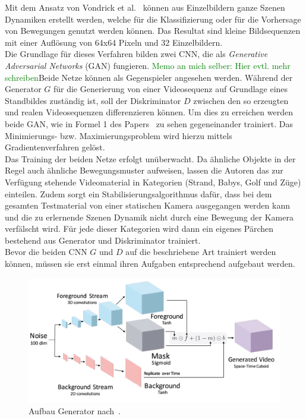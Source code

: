 \documentclass[times, 11pt,twocolumn]{article}
\begin{document}
 \label{sec:Vondrick}
Mit dem Ansatz von Vondrick et al.~\cite{VondrickPT16} können aus Einzelbildern ganze Szenen Dynamiken erstellt werden, welche für die Klassifizierung oder für die Vorhersage von Bewegungen genutzt werden können. Das Resultat sind kleine Bildsequenzen mit einer Auflösung von 64x64 Pixeln und 32 Einzelbildern. \\
Die Grundlage für dieses Verfahren bilden zwei CNN, die als \textit{Generative Adversarial Networks} (GAN) \cite{NIPS2014_5423} fungieren. \textcolor{green}{Memo an mich selber: Hier evtl. mehr schreiben}Beide Netze können als Gegenspieler angesehen werden. Während der Generator $G$ für die Generierung von einer Videosequenz auf Grundlage eines Standbildes zuständig ist, soll der Diskriminator $D$ zwischen den so erzeugten und realen Videosequenzen differenzieren können. Um dies zu erreichen werden beide GAN, wie in Formel 1 des Papers~\cite{VondrickPT16} zu sehen gegeneinander trainiert. Das Minimierungs- bzw. Maximierungsproblem wird hierzu mittels Gradientenverfahren gelöst. \\
Das Training der beiden Netze erfolgt unüberwacht. Da ähnliche Objekte in der Regel auch ähnliche Bewegungsmuster aufweisen, lassen die Autoren das zur Verfügung stehende Videomaterial in Kategorien (Strand, Babys, Golf und Züge) einteilen. Zudem sorgt ein Stabilisierungsalgorithmus dafür, dass bei dem gesamten Testmaterial von einer statischen Kamera ausgegangen werden kann und die zu erlernende Szenen Dynamik nicht durch eine Bewegung der Kamera verfälscht wird. Für jede dieser Kategorien wird dann ein eigenes Pärchen bestehend aus Generator und Diskriminator trainiert. \\
Bevor die beiden CNN $G$ und $D$ auf die beschriebene Art trainiert werden können, müssen sie erst einmal ihren Aufgaben entsprechend aufgebaut werden. \\
\begin{figure}
	\flushleft
	\includegraphics[width=\columnwidth]{Bilder/generator2.jpg}
	\caption{Aufbau Generator nach~\cite{VondrickPT16}.}
	\label{fig:generator}
\end{figure}
\end{document}
